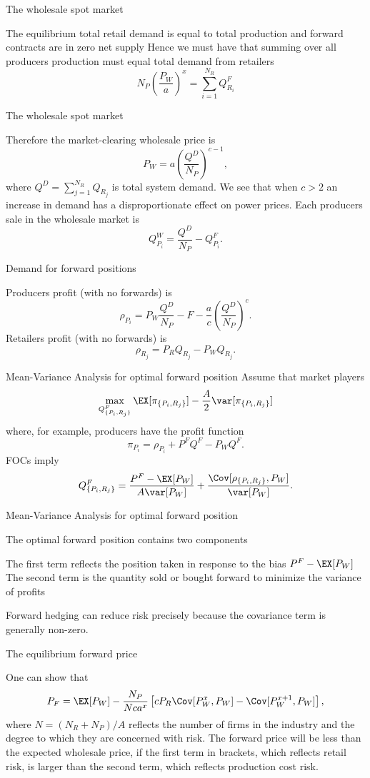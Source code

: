 {The wholesale spot market}

 The equilibrium total retail demand is equal to total production and forward contracts are in zero net supply
 Hence we must have that summing over all producers production must equal total demand from retailers
$$
N_P\left(\frac{P_W}{a}\right)^{x}=\sum_{i=1}^{N_R}Q_{R_i}^F
$$


{The wholesale spot market}

 Therefore the market-clearing wholesale price is
$$
P_W=a \left(\frac{Q^D}{N_P}\right)^{c-1},$$
where $Q^D=\sum_{j=1}^{N_R}Q_{R_j}$ is total system demand. We see that when $c>2$ an increase in demand has a disproportionate effect on power prices.
 Each producers sale in the wholesale market is
$$
Q_{P_i}^W= \frac{Q^D}{N_P}-Q_{P_i}^F.
$$


{Demand for forward positions}

 Producers profit (with no forwards) is
$$
\rho_{P_i}=P_W\frac{Q^D}{N_P}-F-\frac{a}{c}\left(\frac{Q^D}{N_P}\right)^{c}.$$
 Retailers profit (with no forwards) is
$$
\rho_{R_j}=P_RQ_{R_j}-P_WQ_{R_j}.
$$



{Mean-Variance Analysis for optimal forward position}
Assume that market players
$$
\max_{Q^F_{\{P_i,R_j\}}}\EX[\pi_{\{P_i,R_j\}}]-\frac{A}{2}\var[\pi_{\{P_i,R_j\}}]
$$
where, for example, producers have the profit function
$$
\pi_{P_i}=\rho_{P_i}+ P^FQ^F-P_WQ^F.
$$
FOCs imply
$$
Q^F_{\{P_i,R_j\}}= \frac{P^F-\EX[P_W]}{A\var[P_W]}+\frac{\Cov[\rho_{\{P_i,R_j\}},P_W]}{\var[P_W]}.
$$

{Mean-Variance Analysis for optimal forward position}

 The optimal forward position contains two components

 The first term reflects the position taken in response to the bias $P^F-\EX[P_W]$
 The second term is the quantity sold or bought forward to minimize the variance of profits

 Forward hedging can reduce risk precisely because the covariance term is generally non-zero.




{The equilibrium forward price}

 One can show that
$$
P_F=\EX[P_W]-\frac{N_P}{Nca^x}\left[cP_R\Cov[P_W^{x}, P_W]-\Cov[P_W^{x+1}, P_W]\right],
$$
where $N=(N_R+N_P)/A$ reflects the number of firms in the industry and the degree to which they are concerned with risk.
 The forward price will be less than the expected wholesale price, if the first term in brackets, which reflects retail risk, is
larger than the second term, which reflects production cost risk.


